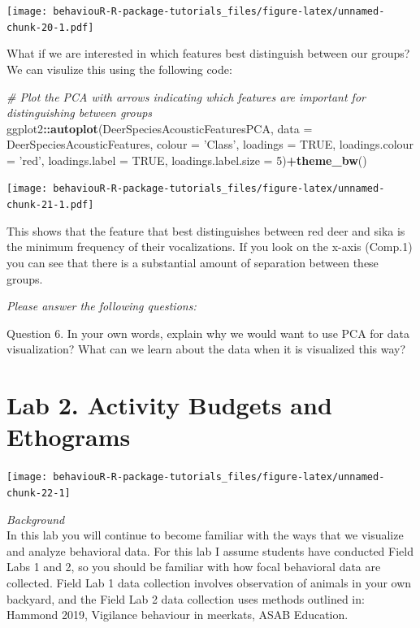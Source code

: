 \documentclass[]{book}
\newenvironment{Shaded}{\begin{snugshade}}{\end{snugshade}}
\newcommand{\CommentTok}[1]{\textcolor[rgb]{0.56,0.35,0.01}{\textit{#1}}}
\newcommand{\DataTypeTok}[1]{\textcolor[rgb]{0.13,0.29,0.53}{#1}}
\newcommand{\DecValTok}[1]{\textcolor[rgb]{0.00,0.00,0.81}{#1}}
\newcommand{\KeywordTok}[1]{\textcolor[rgb]{0.13,0.29,0.53}{\textbf{#1}}}
\newcommand{\NormalTok}[1]{#1}
\newcommand{\OperatorTok}[1]{\textcolor[rgb]{0.81,0.36,0.00}{\textbf{#1}}}
\newcommand{\OtherTok}[1]{\textcolor[rgb]{0.56,0.35,0.01}{#1}}
\newcommand{\StringTok}[1]{\textcolor[rgb]{0.31,0.60,0.02}{#1}}
\begin{document}
\texttt{[image: behaviouR-R-package-tutorials\_files/figure-latex/unnamed-chunk-20-1.pdf]}

What if we are interested in which features best distinguish between our groups?
We can visulize this using the following code:

\begin{Shaded}
\begin{Highlighting}[]
\CommentTok{# Plot the PCA with arrows indicating which features are important for distinguishing between groups}
\NormalTok{ggplot2}\OperatorTok{::}\KeywordTok{autoplot}\NormalTok{(DeerSpeciesAcousticFeaturesPCA, }\DataTypeTok{data =}\NormalTok{ DeerSpeciesAcousticFeatures, }\DataTypeTok{colour =} \StringTok{'Class'}\NormalTok{,}
         \DataTypeTok{loadings =} \OtherTok{TRUE}\NormalTok{, }\DataTypeTok{loadings.colour =} \StringTok{'red'}\NormalTok{,}
         \DataTypeTok{loadings.label =} \OtherTok{TRUE}\NormalTok{,}
         \DataTypeTok{loadings.label.size =} \DecValTok{5}\NormalTok{)}\OperatorTok{+}\KeywordTok{theme_bw}\NormalTok{()}
\end{Highlighting}
\end{Shaded}

\texttt{[image: behaviouR-R-package-tutorials\_files/figure-latex/unnamed-chunk-21-1.pdf]}

This shows that the feature that best distinguishes between red deer and sika is the minimum frequency of their vocalizations. If you look on the x-axis (Comp.1) you can see that there is a substantial amount of separation between these groups.

\emph{Please answer the following questions:}

Question 6. In your own words, explain why we would want to use PCA for data visualization? What can we learn about the data when it is visualized this way?

\hypertarget{lab-2.-activity-budgets-and-ethograms}{%
\chapter{Lab 2. Activity Budgets and Ethograms}\label{lab-2.-activity-budgets-and-ethograms}}

\begin{center}\texttt{[image: behaviouR-R-package-tutorials\_files/figure-latex/unnamed-chunk-22-1]} \end{center}

\emph{Background}\\
In this lab you will continue to become familiar with the ways that we visualize and analyze behavioral data. For this lab I assume students have conducted Field Labs 1 and 2, so you should be familiar with how focal behavioral data are collected. Field Lab 1 data collection involves observation of animals in your own backyard, and the Field Lab 2 data collection uses methods outlined in: Hammond 2019, Vigilance behaviour in meerkats, ASAB Education.
\end{document}
